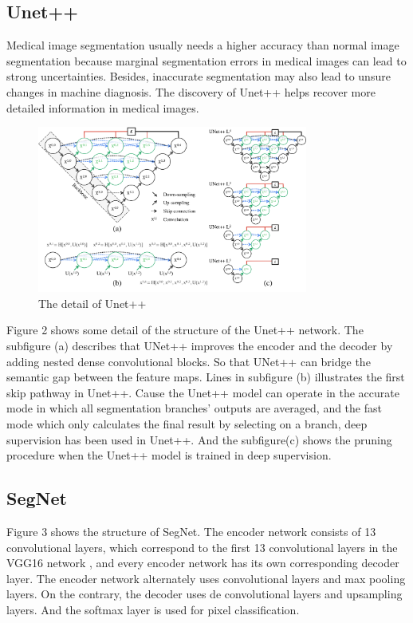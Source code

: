 \documentclass{article}
\begin{document}
\subsection{Unet++}
Medical image segmentation usually needs a higher accuracy than normal image segmentation because marginal segmentation errors in medical images can lead to strong uncertainties.
Besides, inaccurate segmentation may also lead to unsure changes in machine diagnosis.\cite{DBLP:journals/corr/abs-1807-10165}
The discovery of Unet++ helps recover more detailed information in medical images.

\begin{figure}[H]
    \centering
    \includegraphics[width = 3.5in]{Unet++}
    \caption{The detail of Unet++}
    \label{The detail of Unet++}
\end{figure}

Figure 2 shows some detail of the structure of the Unet++ network.
The subfigure (a) describes that UNet++ improves the encoder and the decoder by adding nested dense convolutional blocks.
So that UNet++ can bridge the semantic gap between the feature maps.
Lines in subfigure (b) illustrates the first skip pathway in Unet++.
Cause the Unet++ model can operate in the accurate mode in which all segmentation branches’ outputs are averaged, and the fast mode which only calculates the final result by selecting on a branch, deep supervision has been used in Unet++.
And the subfigure(c) shows the pruning procedure when the Unet++ model is trained in deep supervision.\cite{DBLP:journals/corr/abs-1807-10165,zhou2020unet}

\subsection{SegNet}
Figure 3 shows the structure of SegNet.
The encoder network consists of 13 convolutional layers, which correspond to the first 13 convolutional layers in the VGG16 network \cite{simonyan2014very}, and every encoder network has its own corresponding decoder layer.\cite{DBLP:journals/corr/BadrinarayananK15}
The encoder network alternately uses convolutional layers and max pooling layers. On the contrary, the decoder uses de convolutional layers and upsampling layers.
And the softmax layer is used for pixel classification.
\end{document}
